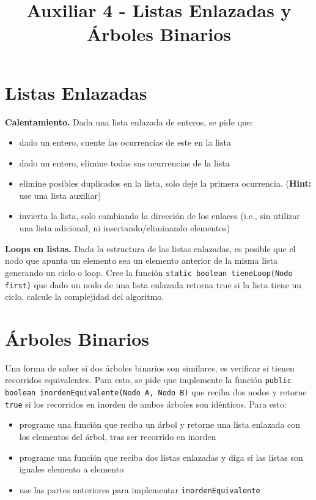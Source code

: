 \documentclass[dcc]{fcfmcourse}
\title{Auxiliar 4 - Listas Enlazadas y Árboles Binarios}
\begin{document}
\maketitle

\vspace{-1ex}

\begin{problems}
\section*{Listas Enlazadas}
\problem \textbf{Calentamiento.} Dada una lista enlazada de enteros, se pide que:
\begin{itemize}
    \item dado un entero, cuente las ocurrencias de este en la lista
    \item dado un entero, elimine todas sus ocurrencias de la lista
    \item elimine posibles duplicados en la lista, solo deje la primera ocurrencia. (\textbf{Hint:} use una lista auxiliar)
    \item invierta la lista, solo cambiando la dirección de los enlaces (i.e., sin utilizar una lista adicional, ni insertando/eliminando elementos)
\end{itemize}

\problem \textbf{Loops en listas.} Dada la estructura de las listas enlazadas, es posible que el nodo que apunta un elemento sea un elemento anterior de la misma lista generando un ciclo o loop. Cree la función \texttt{static boolean tieneLoop(Nodo first)} que dado un nodo de una lista enlazada retorna true si la lista tiene un ciclo, calcule la complejidad del algoritmo.

\section*{Árboles Binarios}
\problem Una forma de saber si dos árboles binarios son similares, es verificar si tienen recorridos equivalentes. Para esto, se pide que implemente la función \texttt{public boolean inordenEquivalente(Nodo A, Nodo B)} que reciba dos nodos y retorne \texttt{true} si los recorridos en inorden de ambos árboles son idénticos.
Para esto:
\begin{itemize}
    \item programe una función que reciba un árbol y retorne una lista enlazada con los elementos del árbol, tras ser recorrido en inorden
    \item programe una función que reciba dos listas enlazadas y diga si las listas son iguales elemento a elemento
    \item use las partes anteriores para implementar \texttt{inordenEquivalente}
\end{itemize}

\end{problems}
\end{document}
